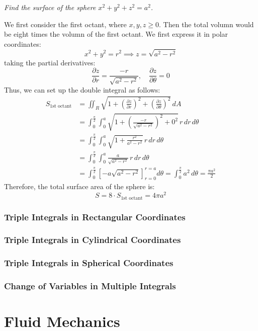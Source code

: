 \documentclass[11pt]{report}
\begin{document}
\begin{example}
    \textit{Find the surface of the sphere $x^2 + y^2 + z^2 = a^2$. }

    We first consider the first octant, where $x, y, z \ge 0$. Then the total volumn would be eight times the volumn of the first octant. We first express it in polar coordinates:
    $$
        x^2 + y^2 = r^2 \implies z = \sqrt{a^2 - r^2}
    $$
    taking the partial derivatives:
    $$
        \frac{\partial z}{\partial r} = \frac{-r}{\sqrt{a^2 - r^2}}, \quad \frac{\partial z}{\partial \theta} = 0
    $$
    Thus, we can set up the double integral as follows:
    \begin{align*}
        S_{\text{1st octant}} &= \iint_R \sqrt{1 + \left( \frac{\partial z}{\partial r} \right)^2 + \left( \frac{\partial z}{\partial \theta} \right)^2} \, dA \\
        &= \int_0^{\frac{\pi}{2}} \int_0^a \sqrt{1 + \left( \frac{-r}{\sqrt{a^2 - r^2}} \right)^2 + 0^2} \, r \, dr \, d\theta \\
        &= \int_0^{\frac{\pi}{2}} \int_0^a \sqrt{1 + \frac{r^2}{a^2 - r^2}} \, r \, dr \, d\theta \\
        &= \int_0^{\frac{\pi}{2}} \int_0^a \frac{a}{\sqrt{a^2 - r^2}} \, r \, dr \, d\theta \\
        &= \int_0^{\frac{\pi}{2}} \left[ -a \sqrt{a^2 - r^2} \right]_{r=0}^{r=a} d\theta = \int_0^{\frac{\pi}{2}} a^2 \, d\theta = \frac{\pi a^2}{2}
    \end{align*}
    Therefore, the total surface area of the sphere is:
    $$        S = 8 \cdot S_{\text{1st octant}} = 4\pi a^2 $$   

\end{example}


\subsection{Triple Integrals in Rectangular Coordinates}
\subsection{Triple Integrals in Cylindrical Coordinates}
\subsection{Triple Integrals in Spherical Coordinates}
\subsection{Change of Variables in Multiple Integrals} \label{sec:change_of_variables}
\chapter{Fluid Mechanics}
\end{document}
